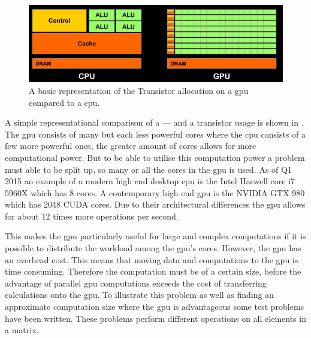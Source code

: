 \begin{figure}[h!]
\centering
 \includegraphics[width=1\textwidth]{figures/GPUCPUimage.png} %
\caption{A basic representation of the Transistor allocation on a \acrshort{gpu} compared to a \acrshort{cpu}. \citep{NvidiaCUDASeminar}}\label{image:gpucpuimage}
\vspace{-15pt}
\end{figure}

A simple representational comparison of a  --- and a  transistor usage is shown in .
The \acrshort{gpu} consists of many but each less powerful cores where the \acrshort{cpu} consists of a few more powerful ones, the greater amount of cores allows for more computational power.
But to be able to utilise this computation power a problem must able to be split up, so many or all the cores in the \acrshort{gpu} is used.
As of Q1 2015 an example of a modern high end desktop \acrshort{cpu} is the Intel Haswell core i7 5960X which has 8 cores. \citep{puget}
A contemporary high end \acrshort{gpu} is the NVIDIA GTX 980 which has 2048 CUDA cores. \citep{techpowerup,gtx980}
Due to their architectural differences the \acrshort{gpu} allows for about 12 times more operations per second.

This makes the \acrshort{gpu} particularly useful for large and complex computations if it is possible to distribute the workload among the \acrshort{gpu}'s cores.
However,  the \acrshort{gpu} has an overhead cost. 
This means that moving data and computations to the \acrshort{gpu} is time consuming.
Therefore the computation must be of a certain size, before the advantage of parallel \acrshort{gpu} computations exceeds the cost of transferring calculations onto the \acrshort{gpu}.
To illustrate this problem as well as finding an approximate computation size where the \acrshort{gpu} is advantageous some test problems have been written. 
These problems perform different operations on all elements in a matrix. 

